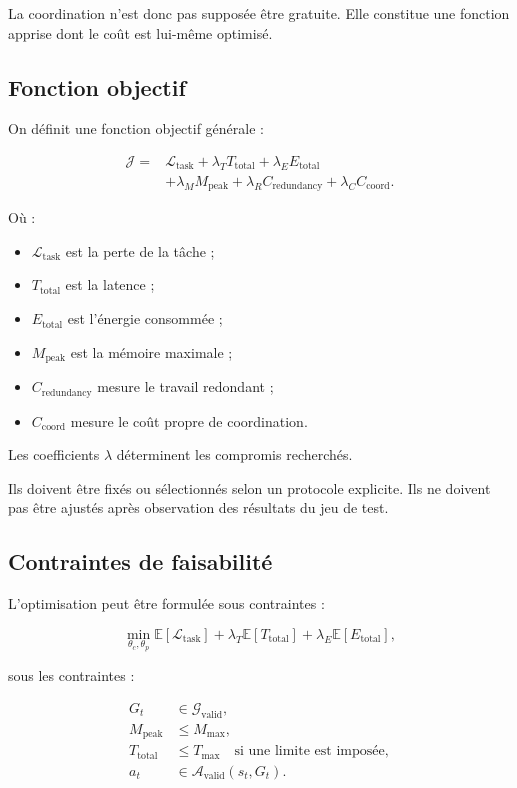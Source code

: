 \documentclass[11pt,a4paper]{article}
\begin{document}
La coordination n'est donc pas supposée être gratuite.
Elle constitue une fonction apprise dont le coût est lui-même
optimisé.

\subsection{Fonction objectif}

On définit une fonction objectif générale :

\[
\begin{aligned}
\mathcal{J}
={}&
\mathcal{L}_{\mathrm{task}}
+\lambda_T T_{\mathrm{total}}
+\lambda_E E_{\mathrm{total}}\\
&+\lambda_M M_{\mathrm{peak}}
+\lambda_R C_{\mathrm{redundancy}}
+\lambda_C C_{\mathrm{coord}}.
\end{aligned}
\]

Où :

\begin{itemize}
  \item $\mathcal{L}_{\mathrm{task}}$ est la perte de la tâche ;
  \item $T_{\mathrm{total}}$ est la latence ;
  \item $E_{\mathrm{total}}$ est l'énergie consommée ;
  \item $M_{\mathrm{peak}}$ est la mémoire maximale ;
  \item $C_{\mathrm{redundancy}}$ mesure le travail redondant ;
  \item $C_{\mathrm{coord}}$ mesure le coût propre de coordination.
\end{itemize}

Les coefficients $\lambda$ déterminent les compromis recherchés.

Ils doivent être fixés ou sélectionnés selon un protocole explicite.
Ils ne doivent pas être ajustés après observation des résultats
du jeu de test.

\subsection{Contraintes de faisabilité}

L'optimisation peut être formulée sous contraintes :

\[
\min_{\theta_c,\theta_p}
\mathbb{E}[\mathcal{L}_{\mathrm{task}}]
+
\lambda_T\mathbb{E}[T_{\mathrm{total}}]
+
\lambda_E\mathbb{E}[E_{\mathrm{total}}],
\]

sous les contraintes :

\[
\begin{aligned}
G_t &\in \mathcal{G}_{\mathrm{valid}},\\
M_{\mathrm{peak}} &\leq M_{\max},\\
T_{\mathrm{total}} &\leq T_{\max}
\quad \text{si une limite est imposée},\\
a_t &\in \mathcal{A}_{\mathrm{valid}}(s_t,G_t).
\end{aligned}
\]
\end{document}
